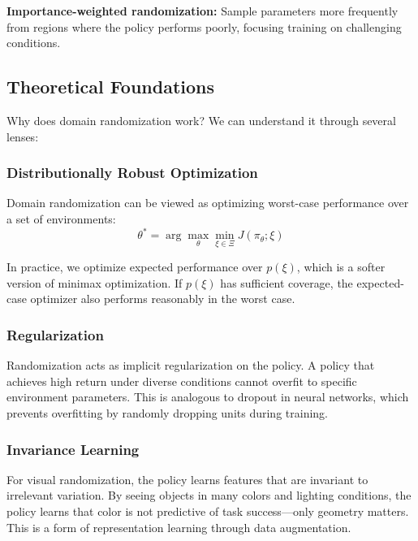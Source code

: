 \textbf{Importance-weighted randomization:} Sample parameters more frequently from regions where the policy performs poorly, focusing training on challenging conditions.

\subsection{Theoretical Foundations}

Why does domain randomization work? We can understand it through several lenses:

\subsubsection{Distributionally Robust Optimization}

Domain randomization can be viewed as optimizing worst-case performance over a set of environments:
\begin{equation}
\theta^* = \arg\max_\theta \min_{\xi \in \Xi} J(\pi_\theta; \xi)
\end{equation}

In practice, we optimize expected performance over $p(\xi)$, which is a softer version of minimax optimization. If $p(\xi)$ has sufficient coverage, the expected-case optimizer also performs reasonably in the worst case.

\subsubsection{Regularization}

Randomization acts as implicit regularization on the policy. A policy that achieves high return under diverse conditions cannot overfit to specific environment parameters. This is analogous to dropout in neural networks, which prevents overfitting by randomly dropping units during training.

\subsubsection{Invariance Learning}

For visual randomization, the policy learns features that are invariant to irrelevant variation. By seeing objects in many colors and lighting conditions, the policy learns that color is not predictive of task success---only geometry matters. This is a form of representation learning through data augmentation.


